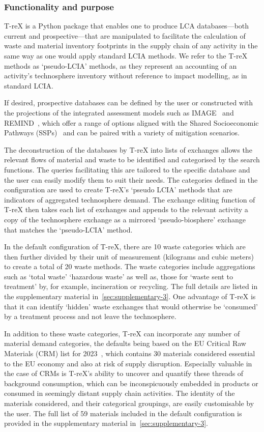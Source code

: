 \documentclass[a4paper,fleqn]{cas-dc}
\begin{document}
\subsubsection{Functionality and purpose}

T-reX is a Python package that enables one to produce LCA databases---both
current and prospective---that are manipulated to facilitate the calculation of
waste and material inventory footprints in the supply chain of any activity in
the same way as one would apply standard LCIA methods. We refer to the T-reX
methods as `pseudo-LCIA' methods, as they represent an accounting of an
activity's technosphere inventory without reference to impact modelling, as in
standard LCIA.

If desired, prospective databases can be defined by the user or constructed
with the projections of the integrated assessment models such as
IMAGE~\citep{stehfest2014image} and REMIND~\citep{remind2020model}, which offer
a range of options aligned with the Shared Socioeconomic Pathways
(SSPs)~\citep{ssp2020ghg} and can be paired with a variety of mitigation
scenarios.

The deconstruction of the databases by T-reX into lists of exchanges allows the
relevant flows of material and waste to be identified and categorised by the
search functions. The queries facilitating this are tailored to the specific
database and the user can easily modify them to suit their needs. The
categories defined in the configuration are used to create T-reX's `pseudo
LCIA' methods that are indicators of aggregated technosphere demand. The
exchange editing function of T-reX then takes each list of exchanges and
appends to the relevant activity a copy of the technosphere exchange as a
mirrored `pseudo-biosphere' exchange that matches the `pseudo-LCIA' method.

In the default configuration of T-reX, there are 10 waste categories which are
then further divided by their unit of measurement (kilograms and cubic meters)
to create a total of 20 waste methods. The waste categories include
aggregations such as `total waste' `hazardous waste' as well as, those for
`waste sent to treatment' by, for example, incineration or recycling. The full
details are listed in the supplementary material in~\autoref{sec:supplementary-3}. One advantage of T-reX is that it can identify `hidden' waste
exchanges that would otherwise be `consumed' by a treatment process and not
leave the technosphere.

In addition to these waste categories, T-reX can incorporate any number of
material demand categories, the defaults being based on the EU Critical Raw
Materials (CRM) list for 2023~\citep{eu2023crmstudy}, which contains 30
materials considered essential to the EU economy and also at risk of supply
disruption. Especially valuable in the case of CRMs is T-reX's ability to
uncover and quantify these threads of background consumption, which can be
inconspicuously embedded in products or consumed in seemingly distant supply
chain activities. The identity of the materials considered, and their
categorical groupings, are easily customisable by the user. The full list of 59
materials included in the default configuration is provided in the
supplementary material in~\autoref{sec:supplementary-3}.
\end{document}

